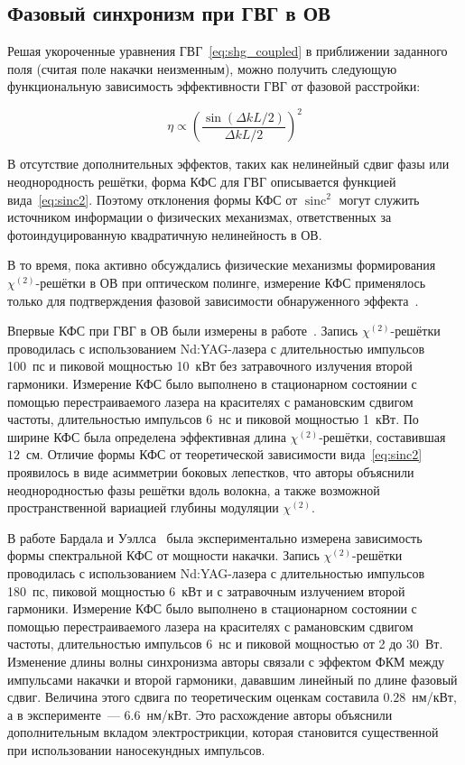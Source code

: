 \subsection{Фазовый синхронизм при ГВГ в ОВ}\label{subsec:phase_memes}

Решая укороченные уравнения ГВГ~\cref{eq:shg_coupled} в приближении заданного поля (считая поле накачки неизменным), можно получить следующую функциональную зависимость эффективности ГВГ от фазовой расстройки:

\begin{equation}\label{eq:sinc2}
	\eta\propto\left(\dfrac{\sin{\left(\Delta k L / 2\right)}}{\Delta k L / 2}\right)^2
\end{equation}

В отсутствие дополнительных эффектов, таких как нелинейный сдвиг фазы или неоднородность решётки, форма КФС для ГВГ описывается функцией вида~\cref{eq:sinc2}. Поэтому отклонения формы КФС от $\operatorname{sinc}^2$ могут служить источником информации о физических механизмах, ответственных за фотоиндуцированную квадратичную нелинейность в ОВ.

В то время, пока активно обсуждались физические механизмы формирования \(\chi^{(2)}\)-решётки в ОВ при оптическом полинге, измерение КФС применялось только для подтверждения фазовой зависимости обнаруженного эффекта~\cite{farries1987second, dianov1989problem}.

Впервые КФС при ГВГ в ОВ были измерены в работе~\cite{farries1987second}. Запись $\chi^{(2)}$-решётки проводилась с использованием Nd:YAG-лазера с длительностью импульсов 100~пс и пиковой мощностью 10~кВт без затравочного излучения второй гармоники. Измерение КФС было выполнено в стационарном состоянии с помощью перестраиваемого лазера на красителях с рамановским сдвигом частоты, длительностью импульсов 6~нс и пиковой мощностью 1~кВт. По ширине КФС была определена эффективная длина $\chi^{(2)}$-решётки, составившая $12$~см. Отличие формы КФС от теоретической зависимости вида~\cref{eq:sinc2} проявилось в виде асимметрии боковых лепестков, что авторы объяснили неоднородностью фазы решётки вдоль волокна, а также возможной пространственной вариацией глубины модуляции $\chi^{(2)}$.


В работе Бардала и Уэллса~\cite{bardal1991intensity} была экспериментально измерена зависимость формы спектральной КФС от мощности накачки. Запись $\chi^{(2)}$-решётки проводилась с использованием Nd:YAG-лазера с длительностью импульсов 180~пс, пиковой мощностью 6~кВт и с затравочным излучением второй гармоники. Измерение КФС было выполнено в стационарном состоянии с помощью перестраиваемого лазера на красителях с рамановским сдвигом частоты, длительностью импульсов 6~нс и пиковой мощностью от 2 до 30~Вт. Изменение длины волны синхронизма авторы связали с эффектом ФКМ между импульсами накачки и второй гармоники, дававшим линейный по длине фазовый сдвиг. Величина этого сдвига по теоретическим оценкам составила $0.28$~нм/кВт, а в эксперименте~--- $6.6$~нм/кВт. Это расхождение авторы объяснили дополнительным вкладом электрострикции, которая становится существенной при использовании наносекундных импульсов.

